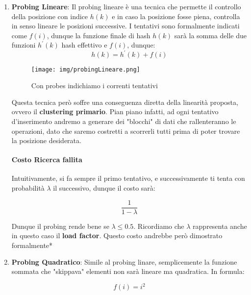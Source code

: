 \documentclass{article}
\begin{document}
\begin{enumerate}
    \item \textbf{Probing Lineare}: Il probing lineare è una tecnica che permette il controllo della posizione con indice $h(k)$ e in caso la posizione fosse piena, controlla in senso lineare le posizioni successive. I tentativi sono formalmente indicati come $f(i)$, dunque la funzione finale di hash $h(k)$ sarà la somma delle due funzioni $h^{'}(k)$ hash effettivo e $f(i)$, dunque:
    \begin{equation}
        h(k)=h^{'}(k)+f(i)
    \end{equation}

    \begin{figure}[htbp]
        \center
        \texttt{[image: img/probingLineare.png]}
        \caption{Con probes indichiamo i correnti tentativi}
    \end{figure}

    Questa tecnica però soffre una conseguenza diretta della linearità proposta, ovvero il \textbf{clustering primario}. Pian piano infatti, ad ogni tentativo d'inserimento andremo a generare dei "blocchi" di dati che rallenteranno le operazioni, dato che saremo costretti a scorrerli tutti prima di poter trovare la posizione desiderata.

    \paragraph{Costo Ricerca fallita} Intuitivamente, si fa sempre il primo tentativo, e successivamente ti tenta con probabilità $\lambda$ il successivo, dunque il costo sarà:

    \begin{equation}
        \frac{1}{1-\lambda}
    \end{equation}
    
Dunque il probing rende bene se $\lambda \leq 0.5$. Ricordiamo che $\lambda$ rappresenta anche in questo caso il \textbf{load factor}.
Questo costo andrebbe però dimostrato formalmente*

\newpage

    \item \textbf{Probing Quadratico}: Simile al probing linare, semplicemente la funzione sommata che "skippava" elementi non sarà lineare ma quadratica. In formula:

    \begin{equation}
        f(i)=i^{2}
    \end{equation}
    

\end{enumerate}
\end{document}
